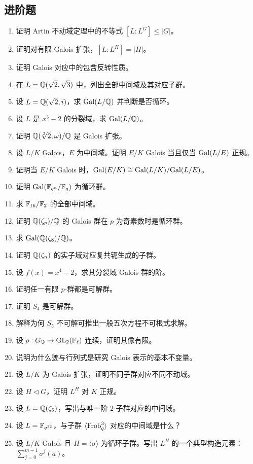 \subsection*{进阶题}
\begin{enumerate}[resume, label=\textbf{\arabic*.}, leftmargin=*, itemsep=0.5em]
\item \medium 证明 Artin 不动域定理中的不等式 $[L:L^G]\le |G|$。
\item \medium 证明对有限 Galois 扩张，$[L:L^H]=|H|$。
\item \medium 证明 Galois 对应中的包含反转性质。
\item \medium 在 $L=\mathbb{Q}(\sqrt2,\sqrt3)$ 中，列出全部中间域及其对应子群。
\item \medium 设 $L=\mathbb{Q}(\sqrt2, i)$，求 $\mathrm{Gal}(L/\mathbb{Q})$ 并判断是否循环。
\item \medium 设 $L$ 是 $x^3-2$ 的分裂域，求 $\mathrm{Gal}(L/\mathbb{Q})$。
\item \medium 证明 $\mathbb{Q}(\sqrt[3]{2},\omega)/\mathbb{Q}$ 是 Galois 扩张。
\item \medium 设 $L/K$ Galois，$E$ 为中间域。证明 $E/K$ Galois 当且仅当 $\mathrm{Gal}(L/E)$ 正规。
\item \medium 证明当 $E/K$ Galois 时，$\mathrm{Gal}(E/K)\cong \mathrm{Gal}(L/K)/\mathrm{Gal}(L/E)$。
\item \medium 证明 $\mathrm{Gal}(\mathbb{F}_{q^n}/\mathbb{F}_q)$ 为循环群。
\item \medium 求 $\mathbb{F}_{16}/\mathbb{F}_2$ 的全部中间域。
\item \medium 证明 $\mathbb{Q}(\zeta_p)/\mathbb{Q}$ 的 Galois 群在 $p$ 为奇素数时是循环群。
\item \medium 求 $\mathrm{Gal}(\mathbb{Q}(\zeta_8)/\mathbb{Q})$。
\item \medium 证明 $\mathbb{Q}(\zeta_n)$ 的实子域对应复共轭生成的子群。
\item \medium 设 $f(x)=x^4-2$，求其分裂域 Galois 群的阶。
\item \medium 证明任一有限 $p$-群都是可解群。
\item \medium 证明 $S_4$ 是可解群。
\item \medium 解释为何 $S_5$ 不可解可推出一般五次方程不可根式求解。
\item \medium 设 $\rho:G_{\mathbb{Q}}\to \mathrm{GL}_2(\mathbb{F}_\ell)$ 连续，证明其像有限。
\item \medium 说明为什么迹与行列式是研究 Galois 表示的基本不变量。
\item \medium 设 $L/K$ 为 Galois 扩张，证明不同子群对应不同不动域。
\item \medium 设 $H\triangleleft G$，证明 $L^H$ 对 $K$ 正规。
\item \medium 设 $L=\mathbb{Q}(\zeta_5)$，写出与唯一阶 $2$ 子群对应的中间域。
\item \medium 设 $L=\mathbb{F}_{q^{12}}$，与子群 $\langle \mathrm{Frob}_q^3\rangle$ 对应的中间域是什么？
\item \medium 设 $L/K$ Galois 且 $H=\langle \sigma\rangle$ 为循环子群。写出 $L^H$ 的一个典型构造元素：$\sum_{j=0}^{m-1}\sigma^j(a)$。
\end{enumerate}


